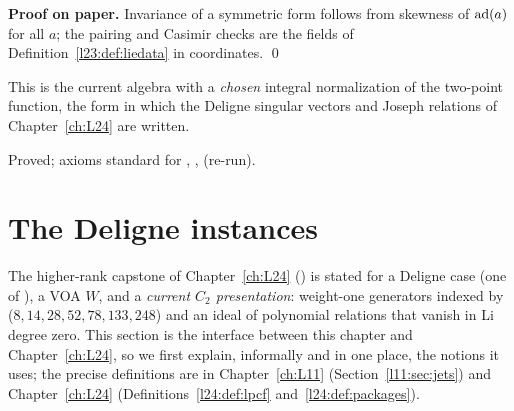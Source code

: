 \textbf{Proof on paper.} Invariance of a symmetric form follows from skewness of $\operatorname{ad}(a)$ for all $a$; the pairing and Casimir checks are
the fields of Definition~\ref{l23:def:liedata} in coordinates. \qed

\begin{physics}
This is the current algebra with a \emph{chosen} integral normalization of the two-point function, the form in which the Deligne singular
vectors and Joseph relations of Chapter~\ref{ch:L24} are written.
\end{physics}

\begin{status}
Proved; axioms standard for , ,  (re-run).
\end{status}

\section{The Deligne instances}\label{l23:sec:deligne}

The higher-rank capstone of Chapter~\ref{ch:L24} ()
is stated for a Deligne case  (one of ), a VOA $W$, and a
\emph{current $C_2$ presentation}: weight-one generators indexed by  ($8,14,28,52,78,133,248$) and an ideal
of polynomial relations that vanish in Li degree zero. This section is the interface between this chapter and
Chapter~\ref{ch:L24}, so we first explain, informally and in one place, the notions it uses; the precise definitions are in
Chapter~\ref{ch:L11} (Section~\ref{l11:sec:jets}) and Chapter~\ref{ch:L24} (Definitions~\ref{l24:def:lpcf} and~\ref{l24:def:packages}).

